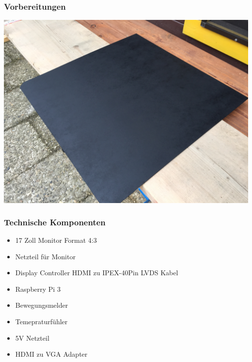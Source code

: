 \documentclass[11pt]{beamer}
\begin{document}
	\begin{frame}
		\frametitle{Vorbereitungen}
		\begin{center}
			\includegraphics[scale=0.07]{images/20170603173640217iOS.jpg}
		\end{center}
	\end{frame}	
		

	\begin{frame}
		\frametitle{Technische Komponenten}
		\begin{itemize}
		\item 17 Zoll Monitor Format 4:3
		\item Netzteil für Monitor
		\item Display Controller HDMI zu IPEX-40Pin LVDS Kabel 
		\item Raspberry Pi 3
		\item Bewegungsmelder
		\item Temepraturfühler
		\item 5V Netzteil
		\item HDMI zu VGA Adapter
		\end{itemize}
	\end{frame}
\end{document}
